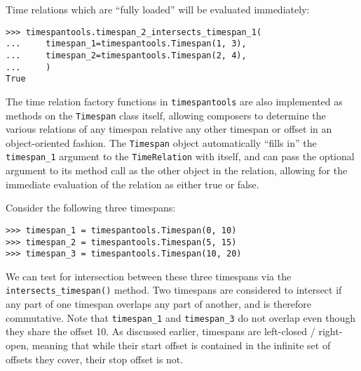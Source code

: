 \noindent Time relations which are \enquote{fully loaded} will be evaluated
immediately:

\begin{comment}
<abjad>
timespantools.timespan_2_intersects_timespan_1(
    timespan_1=timespantools.Timespan(1, 3),
    timespan_2=timespantools.Timespan(2, 4),
    )
</abjad>
\end{comment}

\begin{singlespacing}
\vspace{-0.5\baselineskip}
\begin{lstlisting}
>>> timespantools.timespan_2_intersects_timespan_1(
...     timespan_1=timespantools.Timespan(1, 3),
...     timespan_2=timespantools.Timespan(2, 4),
...     )
True
\end{lstlisting}
\end{singlespacing}

\noindent The time relation factory functions in \texttt{timespantools} are
also implemented as methods on the \texttt{Timespan} class itself, allowing
composers to determine the various relations of any timespan relative any other
timespan or offset in an object-oriented fashion. The \texttt{Timespan} object
automatically \enquote{fills in} the \texttt{timespan\_1} argument to the
\texttt{TimeRelation} with itself, and can pass the optional argument to its
method call as the other object in the relation, allowing for the immediate
evaluation of the relation as either true or false.

Consider the following three timespans:

\begin{comment}
<abjad>
timespan_1 = timespantools.Timespan(0, 10)
timespan_2 = timespantools.Timespan(5, 15)
timespan_3 = timespantools.Timespan(10, 20)
</abjad>
\end{comment}

\begin{singlespacing}
\vspace{-0.5\baselineskip}
\begin{lstlisting}
>>> timespan_1 = timespantools.Timespan(0, 10)
>>> timespan_2 = timespantools.Timespan(5, 15)
>>> timespan_3 = timespantools.Timespan(10, 20)
\end{lstlisting}
\end{singlespacing}

\noindent We can test for intersection between these three timespans via the
\texttt{intersects\_timespan()} method. Two timespans are considered to
intersect if any part of one timespan overlaps any part of another, and is
therefore commutative. Note that \texttt{timespan\_1} and \texttt{timespan\_3}
do not overlap even though they share the offset 10. As discussed earlier,
timespans are left-closed / right-open, meaning that while their start offset is
contained in the infinite set of offsets they cover, their stop offset is not.

